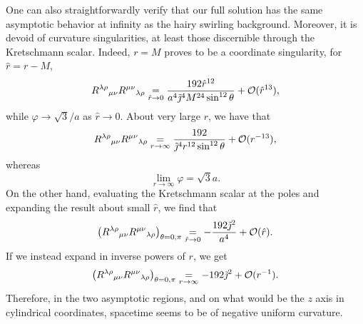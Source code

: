 \documentclass[aps,preprint,groupedaddress,nofootinbib,superscriptaddress,showkeys,showpacs,eqsecnum,amsmath,amssymb]{revtex4-1}
\begin{document}
One can also straightforwardly verify that our full solution has the same asymptotic behavior at infinity as the hairy swirling background. Moreover, it is devoid of curvature singularities, at least those discernible through the Kretschmann scalar. Indeed, $r=M$ proves to be a coordinate singularity, for $\hat{r}=r-M$, 
\begin{equation}
    R^{\lambda\rho}{}_{\mu\nu}R^{\mu\nu}{}_{\lambda\rho} \underset{\hat{r}\to 0}{=} \frac{192\hat{r}^{12}}{a^4\Tilde{\jmath}^4 M^{24}\sin^{12}\theta} +\mathcal{O}(\hat{r}^{13}) ,\label{eq:KretschM}
\end{equation}
while $\varphi \to \sqrt{3}/a$ as $\hat{r}\to 0$. About very large $r$, we have that 
\begin{equation}
    R^{\lambda\rho}{}_{\mu\nu}R^{\mu\nu}{}_{\lambda\rho} \underset{r\to \infty}{=} \frac{192}{\Tilde{\jmath}^4 r^{12} \sin^{12}\theta }+\mathcal{O}(r^{-13}),\label{eq:KretschInf}
\end{equation}
whereas 
\begin{equation}
    \lim\limits_{r\to \infty}\varphi = \sqrt{3}a.
\end{equation}
On the other hand, evaluating the Kretschmann scalar at the poles and expanding the result about small $\hat{r}$, we find that 
\begin{equation}
    \left(R^{\lambda\rho}{}_{\mu\nu}R^{\mu\nu}{}_{\lambda\rho}\right)_{\theta=0,\pi}\underset{\hat{r}\to 0}{=}-\frac{192 \Tilde{\jmath}^2}{a^4}+\mathcal{O}(\hat{r}).
\end{equation}
If we instead expand in inverse powers of $r$, we get 
\begin{equation}
    \left(R^{\lambda\rho}{}_{\mu\nu}R^{\mu\nu}{}_{\lambda\rho}\right)_{\theta=0,\pi}\underset{{r}\to \infty}{=}-192 \Tilde{\jmath}^2+\mathcal{O}(r^{-1}).
\end{equation}
Therefore, in the two asymptotic regions, and on what would be the $z$ axis in cylindrical coordinates, spacetime seems to be of negative uniform curvature. 
\end{document}

